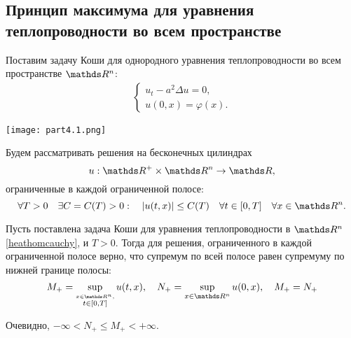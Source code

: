 

\subsection{Принцип максимума для уравнения теплопроводности во всем пространстве}
Поставим задачу Коши для однородного уравнения теплопроводности во всем пространстве $\real^n$:
\begin{align}
    \begin{cases} 
        u_t - a^2 \Delta u = 0, \\
        u (0, x) = \varphi (x).
    \end{cases}
\label{heathomcauchy}
\end{align}

\begin{center}
\texttt{[image: part4.1.png]}
\end{center}

Будем рассматривать решения на бесконечных цилиндрах $$u : \real^+ \times \real^n \rightarrow \real,$$ 
ограниченные в каждой ограниченной полосе: 
\begin{equation}
	\forall T > 0 \quad \exists C = C(T) > 0 : \quad |u(t, x)| \leq C(T) \quad \forall t \in [0, T] \quad \forall x \in \real^n.
\label{условие во всем пространстве}
\end{equation}

\begin{theorem}
Пусть поставлена задача Коши для уравнения теплопроводности в $\real^n$ \eqref{heathomcauchy}, и $T > 0$. Тогда для решения, ограниченного в каждой ограниченной полосе верно, что супремум по всей полосе равен супремуму по нижней границе полосы:
$$ M_+ = \sup_{\stackrel{x \in \real^n,} {t \in [0, T]}}u(t,x), \quad N_+ = \sup_{x \in \real^n} u(0, x), \quad M_+ = N_+ $$

\begin{note}
Очевидно, $-\infty < N_+ \leq M_+ < +\infty.$
\end{note}
\end{theorem}

